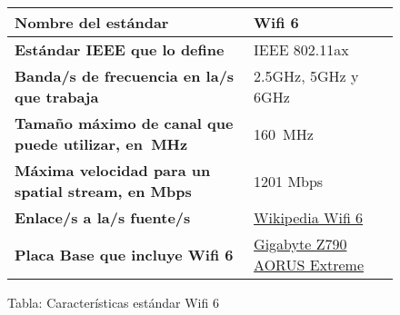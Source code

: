 \begin{figure}[ht]

    \vspace{3ex}
    \centering

    \setlength{\tabcolsep}{10pt}
    \renewcommand{\arraystretch}{1.4}

    \begin{tabular}{| l | l |}
        \hline
        \textbf{Nombre del estándar}  & Wifi 6 \\ \hline
        \textbf{Estándar IEEE que lo define} & IEEE 802.11ax   \\ \hline
        \textbf{Banda/s de frecuencia en la/s que trabaja} & 2.5GHz, 5GHz y 6GHz \\ \hline
        \textbf{Tamaño máximo de canal que puede utilizar, en MHz} & 160 MHz    \\ \hline
        \textbf{Máxima velocidad para un spatial stream, en Mbps} & 1201 Mbps \\ \hline
        \textbf{Enlace/s a la/s fuente/s} & \href{https://en.wikipedia.org/wiki/Wi-Fi_6}{Wikipedia Wifi 6}  \\ \hline
        \textbf{Placa Base que incluye Wifi 6} & \href{https://www.gigabyte.com/Motherboard/Z790-AORUS-XTREME-rev-10/sp#sp}{Gigabyte Z790 AORUS Extreme}   \\ \hline
    \end{tabular}
    \caption{Tabla: Características estándar Wifi 6}
\end{figure}





\newpage



